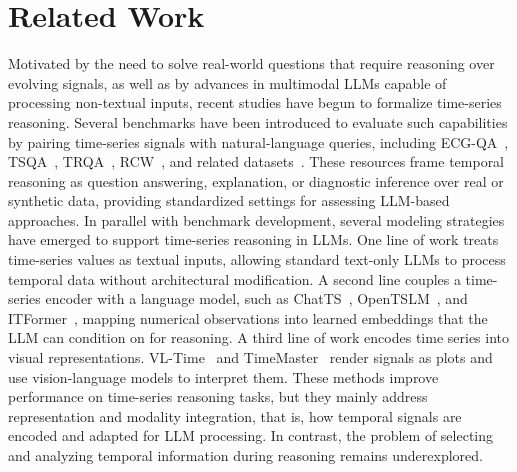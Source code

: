 \section{Related Work}

Motivated by the need to solve real-world questions that require reasoning over evolving signals, as well as by advances in multimodal LLMs capable of processing non-textual inputs, recent studies have begun to formalize time-series reasoning. Several benchmarks have been introduced to evaluate such capabilities by pairing time-series signals with natural-language queries, including ECG-QA~\cite{ecgqa_dataset}, TSQA~\cite{tsqa_dataset}, TRQA~\cite{trqa_dataset}, RCW~\cite{rcw_dataset}, and related datasets~\cite{merrill2024tsandlang}. These resources frame temporal reasoning as question answering, explanation, or diagnostic inference over real or synthetic data, providing standardized settings for assessing LLM-based approaches.
In parallel with benchmark development, several modeling strategies have emerged to support time-series reasoning in LLMs. One line of work treats time-series values as textual inputs, allowing standard text-only LLMs to process temporal data without architectural modification. A second line couples a time-series encoder with a language model, such as ChatTS~\cite{chatts}, OpenTSLM~\cite{langer2025opentslm}, and ITFormer~\cite{itformer}, mapping numerical observations into learned embeddings that the LLM can condition on for reasoning. A third line of work encodes time series into visual representations. VL-Time~\cite{rcw_dataset} and TimeMaster~\cite{zhang2025timemaster} render signals as plots and use vision-language models to interpret them. These methods improve performance on time-series reasoning tasks, but they mainly address representation and modality integration, that is, how temporal signals are encoded and adapted for LLM processing. In contrast, the problem of selecting and analyzing temporal information during reasoning remains underexplored.


